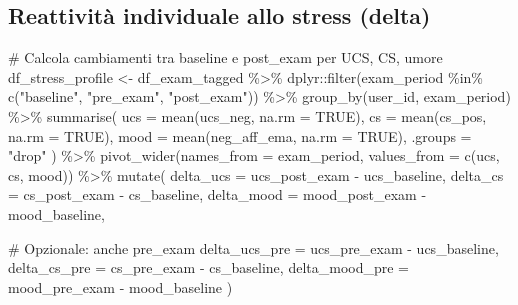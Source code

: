 \documentclass[
  11pt,
  a4paper,
  onecolumn]{article}
\newenvironment{Shaded}{}{}
\newcommand{\AttributeTok}[1]{\textcolor[rgb]{0.84,0.23,0.29}{#1}}
\newcommand{\CommentTok}[1]{\textcolor[rgb]{0.42,0.45,0.49}{#1}}
\newcommand{\ConstantTok}[1]{\textcolor[rgb]{0.00,0.36,0.77}{#1}}
\newcommand{\FunctionTok}[1]{\textcolor[rgb]{0.44,0.26,0.76}{#1}}
\newcommand{\NormalTok}[1]{\textcolor[rgb]{0.14,0.16,0.18}{#1}}
\newcommand{\OtherTok}[1]{\textcolor[rgb]{0.44,0.26,0.76}{#1}}
\newcommand{\SpecialCharTok}[1]{\textcolor[rgb]{0.00,0.36,0.77}{#1}}
\newcommand{\StringTok}[1]{\textcolor[rgb]{0.01,0.18,0.38}{#1}}
\begin{document}
\subsection{Reattività individuale allo stress
(delta)}\label{reattivituxe0-individuale-allo-stress-delta}

\begin{Shaded}
\begin{Highlighting}[]
\CommentTok{\# Calcola cambiamenti tra baseline e post\_exam per UCS, CS, umore}
\NormalTok{df\_stress\_profile }\OtherTok{\textless{}{-}}\NormalTok{ df\_exam\_tagged }\SpecialCharTok{\%\textgreater{}\%}
\NormalTok{  dplyr}\SpecialCharTok{::}\FunctionTok{filter}\NormalTok{(exam\_period }\SpecialCharTok{\%in\%} \FunctionTok{c}\NormalTok{(}\StringTok{"baseline"}\NormalTok{, }\StringTok{"pre\_exam"}\NormalTok{, }\StringTok{"post\_exam"}\NormalTok{)) }\SpecialCharTok{\%\textgreater{}\%}
  \FunctionTok{group\_by}\NormalTok{(user\_id, exam\_period) }\SpecialCharTok{\%\textgreater{}\%}
  \FunctionTok{summarise}\NormalTok{(}
    \AttributeTok{ucs =} \FunctionTok{mean}\NormalTok{(ucs\_neg, }\AttributeTok{na.rm =} \ConstantTok{TRUE}\NormalTok{),}
    \AttributeTok{cs  =} \FunctionTok{mean}\NormalTok{(cs\_pos, }\AttributeTok{na.rm =} \ConstantTok{TRUE}\NormalTok{),}
    \AttributeTok{mood =} \FunctionTok{mean}\NormalTok{(neg\_aff\_ema, }\AttributeTok{na.rm =} \ConstantTok{TRUE}\NormalTok{),}
    \AttributeTok{.groups =} \StringTok{"drop"}
\NormalTok{  ) }\SpecialCharTok{\%\textgreater{}\%}
  \FunctionTok{pivot\_wider}\NormalTok{(}\AttributeTok{names\_from =}\NormalTok{ exam\_period, }\AttributeTok{values\_from =} \FunctionTok{c}\NormalTok{(ucs, cs, mood)) }\SpecialCharTok{\%\textgreater{}\%}
  \FunctionTok{mutate}\NormalTok{(}
    \AttributeTok{delta\_ucs  =}\NormalTok{ ucs\_post\_exam }\SpecialCharTok{{-}}\NormalTok{ ucs\_baseline,}
    \AttributeTok{delta\_cs   =}\NormalTok{ cs\_post\_exam  }\SpecialCharTok{{-}}\NormalTok{ cs\_baseline,}
    \AttributeTok{delta\_mood =}\NormalTok{ mood\_post\_exam }\SpecialCharTok{{-}}\NormalTok{ mood\_baseline,}
    
    \CommentTok{\# Opzionale: anche pre\_exam}
    \AttributeTok{delta\_ucs\_pre  =}\NormalTok{ ucs\_pre\_exam }\SpecialCharTok{{-}}\NormalTok{ ucs\_baseline,}
    \AttributeTok{delta\_cs\_pre   =}\NormalTok{ cs\_pre\_exam  }\SpecialCharTok{{-}}\NormalTok{ cs\_baseline,}
    \AttributeTok{delta\_mood\_pre =}\NormalTok{ mood\_pre\_exam }\SpecialCharTok{{-}}\NormalTok{ mood\_baseline}
\NormalTok{  )}
\end{Highlighting}
\end{Shaded}
\end{document}
